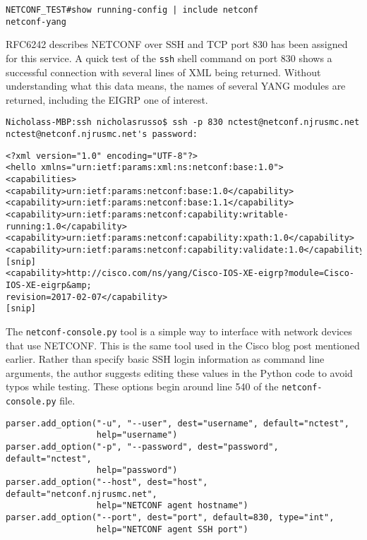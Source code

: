 \begin{verbatim}
NETCONF_TEST#show running-config | include netconf
netconf-yang
\end{verbatim}

RFC6242 describes NETCONF over SSH and TCP port 830 has been assigned for this
service. A quick test of the \verb|ssh| shell command on port 830 shows a
successful connection with several lines of XML being returned. Without
understanding what this data means, the names of several YANG modules are
returned, including the EIGRP one of interest.

\begin{verbatim}
Nicholass-MBP:ssh nicholasrusso$ ssh -p 830 nctest@netconf.njrusmc.net
nctest@netconf.njrusmc.net's password:
\end{verbatim}

\begin{verbatim}
<?xml version="1.0" encoding="UTF-8"?>
<hello xmlns="urn:ietf:params:xml:ns:netconf:base:1.0">
<capabilities>
<capability>urn:ietf:params:netconf:base:1.0</capability>
<capability>urn:ietf:params:netconf:base:1.1</capability>
<capability>urn:ietf:params:netconf:capability:writable-running:1.0</capability>
<capability>urn:ietf:params:netconf:capability:xpath:1.0</capability>
<capability>urn:ietf:params:netconf:capability:validate:1.0</capability>
[snip]
<capability>http://cisco.com/ns/yang/Cisco-IOS-XE-eigrp?module=Cisco-IOS-XE-eigrp&amp;
revision=2017-02-07</capability>
[snip]
\end{verbatim}

The \verb|netconf-console.py| tool is a simple way to interface with network
devices that use NETCONF\@. This is the same tool used in the Cisco blog post
mentioned earlier. Rather than specify basic SSH login information as command
line arguments, the author suggests editing these values in the Python code to
avoid typos while testing. These options begin around line 540 of the
\verb|netconf-console.py| file.

\begin{verbatim}
parser.add_option("-u", "--user", dest="username", default="nctest",
                  help="username")
parser.add_option("-p", "--password", dest="password", default="nctest",
                  help="password")
parser.add_option("--host", dest="host", default="netconf.njrusmc.net",
                  help="NETCONF agent hostname")
parser.add_option("--port", dest="port", default=830, type="int",
                  help="NETCONF agent SSH port")
\end{verbatim}

